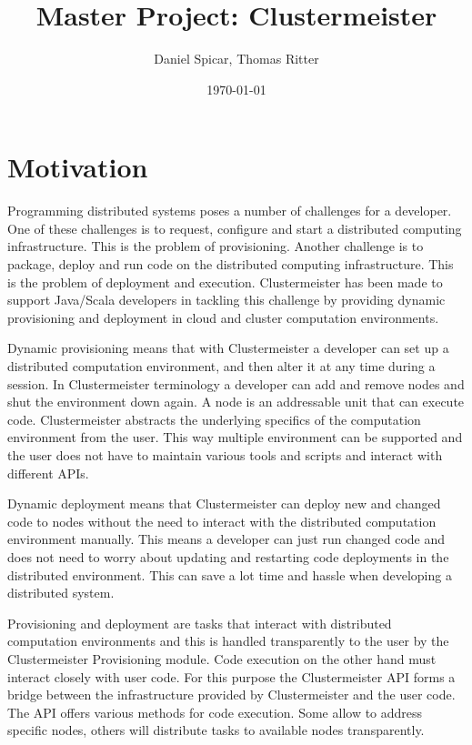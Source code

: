 \documentclass[12pt]{article}
\begin{document}
\title{Master Project: Clustermeister}


\author{Daniel Spicar, Thomas Ritter}

\date{\today}

\maketitle


\section{Motivation}

Programming distributed systems poses a number of challenges for a developer. One of these challenges is to request, configure and start a distributed computing infrastructure. This is the problem of provisioning. Another challenge is to package, deploy and run code on the distributed computing infrastructure. This is the problem of deployment and execution. Clustermeister has been made to support Java/Scala developers in tackling this challenge by providing dynamic provisioning and deployment in cloud and cluster computation environments.

Dynamic provisioning means that with Clustermeister a developer can set up a distributed computation environment, and then alter it at any time during a session. In Clustermeister terminology a developer can add and remove nodes and shut the environment down again. A node is an addressable unit that can execute code. Clustermeister abstracts the underlying specifics of the computation environment from the user. This way multiple environment can be supported and the user does not have to maintain various tools and scripts and interact with different APIs.

Dynamic deployment means that Clustermeister can deploy new and changed code to nodes without the need to interact with the distributed computation environment manually. This means a developer can just run changed code and does not need to worry about updating and restarting code deployments in the distributed environment. This can save a lot time and hassle when developing a distributed system.

Provisioning and deployment are tasks that interact with distributed computation environments and this is handled transparently to the user by the Clustermeister Provisioning module. Code execution on the other hand must interact closely with user code. For this purpose the Clustermeister API forms a bridge between the infrastructure provided by Clustermeister and the user code. The API offers various methods for code execution. Some allow to address specific nodes, others will distribute tasks to available nodes transparently.
\end{document}
